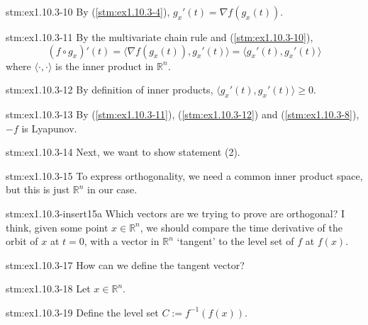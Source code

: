 \begin{statement}{stm:ex1.10.3-10}
By (\ref{stm:ex1.10.3-4}), $g_x'(t) = \nabla f(g_x(t))$. 
\end{statement}

\begin{statement}{stm:ex1.10.3-11}
By the multivariate chain rule and (\ref{stm:ex1.10.3-10}), $$(f \circ g_x)'(t) = \langle \nabla f(g_x(t)), g_x'(t) \rangle = \langle g_x'(t), g_x'(t) \rangle$$ where $\langle \cdot, \cdot \rangle$ is the inner product in $\mathbb{R}^n$. 
\end{statement}

\begin{statement}{stm:ex1.10.3-12}
By definition of inner products, $\langle g_x'(t), g_x'(t) \rangle \ge 0$.
\end{statement}

\begin{statement}{stm:ex1.10.3-13}
By (\ref{stm:ex1.10.3-11}), (\ref{stm:ex1.10.3-12}) and (\ref{stm:ex1.10.3-8}), $-f$ is Lyapunov.
\end{statement}

\begin{explanation}{stm:ex1.10.3-14}
Next, we want to show statement (2).
\end{explanation}

\begin{explanation}{stm:ex1.10.3-15}
To express orthogonality, we need a common inner product space, but this is just $\mathbb{R}^n$ in our case.
\end{explanation}

\begin{explanation}{stm:ex1.10.3-insert15a}
Which vectors are we trying to prove are orthogonal? I think, given some point $x \in \mathbb{R}^n$, we should compare the time derivative of the orbit of $x$ at $t=0$, with a vector in $\mathbb{R}^n$ ‘tangent’ to the level set of $f$ at $f(x)$.
\end{explanation}

\begin{explanation}{stm:ex1.10.3-17}
How can we define the tangent vector?
\end{explanation}

\begin{statement}{stm:ex1.10.3-18}
Let $x \in \mathbb{R}^n$.
\end{statement}

\begin{statement}{stm:ex1.10.3-19}
Define the level set $C := f^{-1}(f(x))$.
\end{statement}

